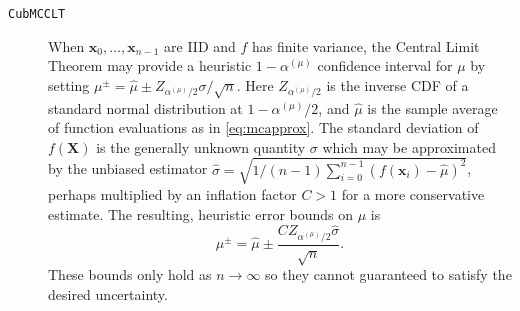\documentclass[graybox]{svmult}
\begin{document}
\begin{description}
    \item[\texttt{CubMCCLT}] When $\boldsymbol{x}_0,\dots,\boldsymbol{x}_{n-1}$ are IID and $f$ has finite variance, the Central Limit Theorem may provide a heuristic $1-\alpha^{(\mu)}$ confidence interval for $\mu$ by setting $\mu^\pm = \hat{\mu} \pm Z_{\alpha^{(\mu)}/2}\sigma/\sqrt{n}$. Here $Z_{\alpha^{(\mu)}/2}$ is the inverse CDF of a standard normal distribution at $1-\alpha^{(\mu)}/2$, and $\hat{\mu}$ is the sample average of function evaluations as in \eqref{eq:mcapprox}. The standard deviation of $f(\boldsymbol{X})$ is the generally unknown quantity $\sigma$ which may be approximated by the unbiased estimator $\hat{\sigma} = \sqrt{1/(n-1)\sum_{i=0}^{n-1}(f(\boldsymbol{x}_i)-\hat{\mu})^2}$, perhaps multiplied by an inflation factor $C>1$ for a more conservative estimate. The resulting, heuristic error bounds on $\mu$ is
    \begin{equation*}
        \mu^\pm = \hat{\mu} \pm \frac{CZ_{\alpha^{(\mu)}/2}\hat{\sigma}}{\sqrt{n}}
        \label{eq:clt_mu_bounds}.
    \end{equation*}
    These bounds only hold as $n \to \infty$ so they cannot guaranteed to satisfy the desired uncertainty.
    

\end{description}
\end{document}
